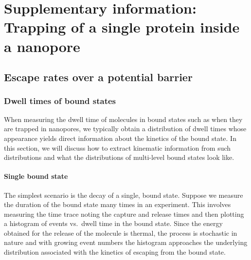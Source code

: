 \chapter[SI: Trapping of a single protein inside a nanopore]%
        {Supplementary information: Trapping of a single protein inside a nanopore}
%
\label{ch:trapping_appendix}
%

\begin{shaded}
\newpage
\end{shaded}


%
\section{Escape rates over a potential barrier}
%
\label{sec:trapping_appendix:escape_rates}
%


\subsection{Dwell times of bound states}
%

When measuring the dwell time of molecules in bound states such as when they are trapped in nanopores, we
typically obtain a distribution of dwell times whose appearance yields direct information about the kinetics
of the bound state. In this section, we will discuss how to extract kinematic information from such
distributions and what the distributions of multi-level bound states look like.


\subsubsection{Single bound state}
%
\label{sec:trapping_appendix:single_bound_state}
%

The simplest scenario is the decay of a single, bound state. Suppose we measure the duration of the bound state
many times in an experiment. This involves measuring the time trace noting the capture and release times and
then plotting a histogram of events vs.~dwell time in the bound state. Since the energy obtained for the
release of the molecule is thermal, the process is stochastic in nature and with growing event numbers the
histogram approaches the underlying distribution associated with the kinetics of escaping from the bound
state.

